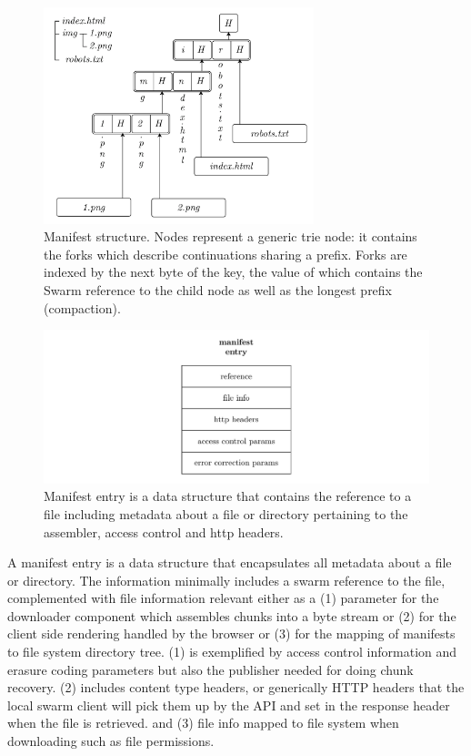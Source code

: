 \begin{figure}[htbp]
\centering
\includegraphics[width=0.7\textwidth]{fig/manifest-structure.pdf}
\caption[Manifest structure \statusgreen]{Manifest structure. Nodes represent a generic trie node: it contains the forks which describe continuations sharing a prefix. Forks are indexed by the next byte of the key, the value of which contains the Swarm reference to the child node as well as the longest prefix (compaction).}
\label{fig:manifest-structure}
\end{figure}

\begin{figure}[htbp]
\centering
\includegraphics[width=\textwidth]{fig/manifest-entry.pdf}
\caption[Manifest entry \statusgreen]{Manifest entry is a data  structure that contains the reference to a file including metadata about a file or directory  pertaining to the assembler, access control and http headers.}
\label{fig:manifest-entry}
\end{figure}

A manifest entry is a data  structure that encapsulates all metadata about a file or directory.
The information minimally includes a swarm reference to the file, complemented with file information
relevant either as a (1) parameter for the downloader component which assembles chunks into a byte stream or (2) for the client side rendering handled by the browser or (3) for the mapping of manifests to file system directory tree. (1) is exemplified by access control information and erasure coding parameters but also the publisher needed for doing chunk recovery. (2) includes content type headers, or generically HTTP headers that the local swarm client will pick them up by the API and set in the response header when the file is retrieved. 
and (3) file info mapped to file system when downloading such as file permissions.

